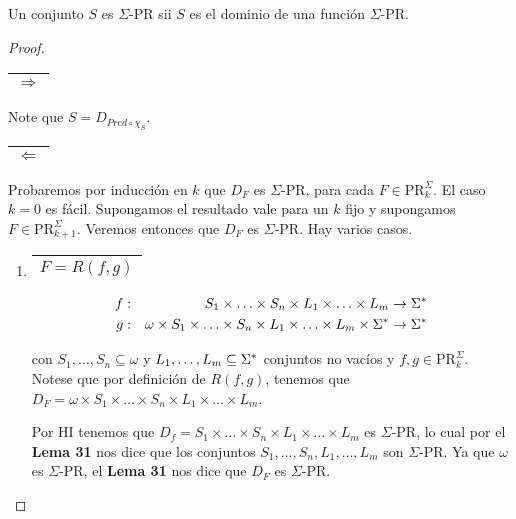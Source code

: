   \begin{proposition}
    \par Un conjunto $S$ es $\Sigma$-PR sii $S$ es el dominio de una función $\Sigma$-PR.
  \end{proposition}
  \begin{proof}
    \begin{tabular}{|c|} \hline $\Rightarrow$ \\\hline \end{tabular} Note que $S = D_{Pred \circ \chi_{S}}$.

    \begin{tabular}{|c|} \hline $\Leftarrow$ \\\hline \end{tabular} Probaremos por inducción en $k$ que $D_{F}$ es
      $\Sigma$-PR, para cada $F \in \mathrm{PR}_{k}^{\Sigma}$. El caso $k=0$ es fácil. Supongamos el resultado vale para
      un $k$ fijo y supongamos $F \in \mathrm{PR}_{k+1}^{\Sigma}$. Veremos entonces que $D_{F}$ es $\Sigma$-PR. Hay
      varios casos.

    \begin{enumerate}
      \item \begin{tabular}{|c|} \hline $F = R(f, g)$\\\hline \end{tabular}
        \begin{eqnarray}
          \nonumber f &:& S_{1} \times \dotsc \times S_{n} \times L_{1} \times \dotsc \times L_{m} \rightarrow \Sigma^{\ast} \\
          \nonumber g &:& \omega \times S_{1} \times \dotsc \times S_{n} \times L_{1} \times \dotsc \times L_{m} \times
          \Sigma^{\ast} \rightarrow \Sigma^{\ast}
        \end{eqnarray}

        \par con $S_{1}, \dotsc, S_{n} \subseteq \omega$ y $L_{1}, \dotsc, L_{m} \subseteq \Sigma^{\ast}$ conjuntos no vacíos
        y $f, g \in \mathrm{PR}_{k}^{\Sigma}$. Notese que por definición de $R(f, g)$, tenemos que $D_{F} = \omega
        \times S_{1} \times \dotsc \times S_{n} \times L_{1} \times \dotsc \times L_{m}$.

        \par Por HI tenemos que $D_{f} = S_{1} \times \dotsc \times S_{n} \times L_{1} \times \dotsc \times L_{m}$ es
        $\Sigma$-PR, lo cual por el \textbf{Lema 31} nos dice que los conjuntos $S_{1}, \dotsc, S_{n}, L_{1}, \dotsc,
        L_{m}$ son $\Sigma$-PR. Ya que $\omega$ es $\Sigma$-PR, el \textbf{Lema 31} nos dice que $D_{F}$ es $\Sigma$-PR.


\end{enumerate}
\end{proof}
